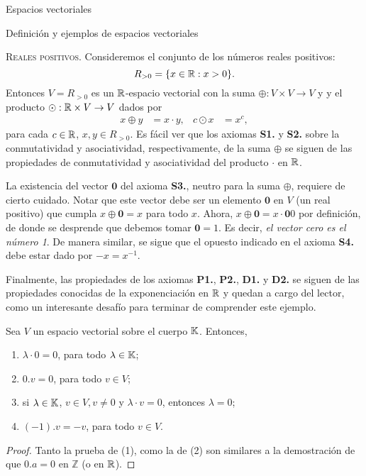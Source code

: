 \begin{chapter}{Espacios vectoriales}
\begin{section}{Definici\'on y ejemplos de espacios vectoriales}
            
            
            \medspace
            
            \begin{ejemplo*}{\textsc{Reales positivos.}}
            Consideremos el conjunto de los números reales positivos:
            \[
            R_{>0}=\{x\in\mathbb R : x>0\}.
            \]
            Entonces $V=R_{>0}$ es un $\mathbb R$-espacio vectorial con la suma $\oplus:V\times V\to V$ y  y el producto $\odot:\mathbb R\times V\to V$ dados por
            \begin{align*}
            x\oplus y&=x\cdot y, & c\odot x&=x^c,
            \end{align*}
            para cada $c\in\mathbb R$, $x,y\in R_{>0}$.
Es fácil ver que los axiomas \textbf{S1.} y \textbf{S2.} sobre la conmutatividad y asociatividad, respectivamente, de la suma $\oplus$ se siguen de las propiedades de conmutatividad y asociatividad del producto $\cdot$ en $\mathbb R$.

La existencia del vector $\textbf{0}$ del axioma \textbf{S3.}, neutro para la suma $\oplus$, requiere de cierto cuidado. Notar que este vector debe ser un elemento $\textbf{0}$ en $V$ (un real positivo) que cumpla $x\oplus \textbf{0}=x$ para todo $x$. Ahora, $x\oplus \textbf{0}=x\cdot \textbf{0}0$ por definición, de donde se desprende que debemos tomar $\textbf{0}=1$. Es decir, \textit{el vector cero es el número 1}. De manera similar, se sigue que el opuesto indicado en el  axioma \textbf{S4.} debe estar dado por $-x=x^{-1}$.

Finalmente, las propiedades de los axiomas \textbf{P1.}, \textbf{P2.}, \textbf{D1.} y \textbf{D2.} se siguen de las propiedades conocidas de la exponenciación en $\mathbb R$ y quedan a cargo del lector, como un interesante desafío para terminar de comprender este ejemplo.
\end{ejemplo*}            

            \begin{proposicion}\label{prop-basicas-ev} Sea $V$ un espacio vectorial sobre el cuerpo $\mathbb K$. Entonces,
                \begin{enumerate}
                    \item\label{c*0=0} $\lambda\cdot 0=0$, para todo $\lambda \in \mathbb K$;
                    \item\label{0*c=0} $0.v = 0$, para todo $v \in V$;
                    \item\label{c*v=0} si $\lambda \in \mathbb K$, $v \in V, v\ne 0$ y $\lambda\cdot v=0$,  entonces $\lambda =0$;
                    \item\label{-1*v=-v} $(-1).v = -v$, para todo $v \in V$.
                \end{enumerate}
            \end{proposicion}
            \begin{proof} Tanto la prueba de (1), como la de (2) son similares a la demostración de que $0.a=0$  en $\mathbb Z$ (o en  $\mathbb R$).
                 

\end{proof}
\end{section}
\end{chapter}
